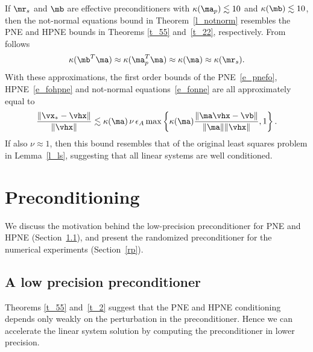 \documentclass[final]{siamart220329}%
\begin{document}
\begin{remark}\label{s_comp}
If $\mr_s$ and $\mb$ are effective preconditioners with 
$\kappa(\ma_p)\lesssim 10$ and  
$\kappa(\mb)\lesssim 10$, then 
the not-normal equations bound in Theorem~\ref{l_notnorm} resembles the 
PNE and HPNE bounds in Theorems \ref{t_55} and~\ref{t_22}, respectively.
From~\cite[Section 3]{ipsen2025solutionsquaresproblemsrandomized} 
follows 
\begin{align*}
\kappa(\mb^T\ma)\approx\kappa(\ma_p^T\ma)\approx \kappa(\ma)\approx\kappa(\mr_s).
\end{align*}
With these approximations, the first order bounds of the PNE~\eqref{e_pnefo}, HPNE~\eqref{e_fohpne} and not-normal equations~\eqref{e_fonne} are all approximately equal to
\begin{align*}%
     \frac{\|\vx_*-\vhx\|}{\|\vhx\|}\lesssim
\kappa(\ma)\,\nu\,\epsilon_A\max\left\{\kappa(\ma)\frac{\|\ma\vhx-\vb\|}{\|\ma\|\|\vhx\|},1\right\}.
 \end{align*}
If also $\nu\approx 1$, then this bound resembles that of the original least squares problem in Lemma~\ref{l_ls}, suggesting that
all linear systems are well conditioned.
\end{remark}


\section{Preconditioning}\label{s_lpp}
We discuss the motivation behind the low-precision
preconditioner for PNE and HPNE (Section~\ref{mpprec}), and
present the randomized preconditioner for the numerical experiments (Section~\ref{rp}).

\subsection{A low precision preconditioner}\label{mpprec}
Theorems \ref{t_55} and~\ref{t_2}
suggest that the PNE and HPNE
conditioning depends only weakly on the perturbation in the preconditioner.
Hence we can accelerate the linear system solution by computing the preconditioner in lower precision. 
\end{document}

